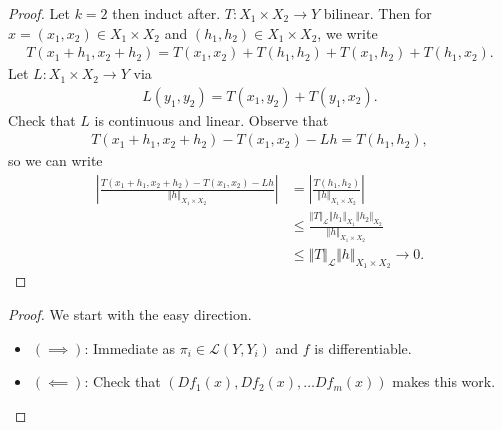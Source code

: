 \documentclass{report}
\begin{document}
\begin{proof}
    Let $k=2$ then induct after. $T: X_1 \times X_2 \to Y$ bilinear. Then for $x = (x_1, x_2) \in X_1 \times X_2$ and $(h_1, h_2) \in X_1 \times X_2$, we write 
    \begin{align*}
        T(x_1 + h_1, x_2 + h_2) = T(x_1, x_2) + T(h_1, h_2) + T(x_1, h_2) + T(h_1, x_2).
    \end{align*}
    Let $L: X_1 \times X_2 \to Y$ via 
    \begin{align*}
        L(y_1, y_2) = T(x_1, y_2) + T(y_1, x_2).
    \end{align*}
    Check that $L$ is continuous and linear. Observe that 
    \begin{align*}
        T(x_1 + h_1, x_2 + h_2) - T(x_1, x_2) - Lh = T(h_1, h_2),
    \end{align*}
    so we can write 
    \begin{align*}
        \left|\frac{T(x_1 + h_1, x_2 + h_2) - T(x_1, x_2) - Lh}{\Vert h\Vert_{X_1 \times X_2}}\right| &= \left| \frac{T(h_1, h_2)}{\Vert h \Vert_{X_1 \times X_2}}\right| \\
        &\leq \frac{\Vert T \Vert_{\mathcal L} \Vert h_1 \Vert_{X_1} \Vert h_2 \Vert_{X_2}}{\Vert h \Vert_{X_1 \times X_2}} \\
        &\leq \Vert T\Vert_{\mathcal L} \Vert h \Vert_{X_1 \times X_2} \to 0.
    \end{align*}
\end{proof}
\begin{proof}
    We start with the easy direction.
    \begin{itemize}
        \item $(\implies)$: Immediate as $\pi_i \in \mathcal L(Y, Y_i)$ and $f$ is differentiable.
        \item $(\impliedby)$: Check that $(Df_1(x) , Df_2(x), \ldots Df_m(x))$ makes this work.
    \end{itemize}
\end{proof}
\end{document}
